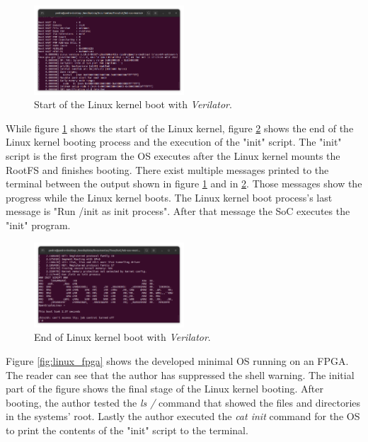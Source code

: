 \begin{figure}[!ht]
    \centering
    \includegraphics[width=0.5\textwidth]{../images/start_Linux_sim.png}
    \caption{Start of the Linux kernel boot with \textit{Verilator}.}
    \label{fig:start_linux_sim}
\end{figure}

While figure \ref{fig:start_linux_sim} shows the start of the Linux kernel, figure \ref{fig:end_linux_verilator} shows the end of the Linux kernel booting process and the execution of the "init" script. The "init" script is the first program the OS executes after the Linux kernel mounts the RootFS and finishes booting. There exist multiple messages printed to the terminal between the output shown in figure \ref{fig:start_linux_sim} and in \ref{fig:end_linux_verilator}. Those messages show the progress while the Linux kernel boots. The Linux kernel boot process's last message is "Run /init as init process". After that message the SoC executes the "init" program.

\begin{figure}[!ht]
    \centering
    \includegraphics[width=0.5\textwidth]{../images/end_Linux_sim.png}
    \caption{End of Linux kernel boot with \textit{Verilator}.}
    \label{fig:end_linux_verilator}
\end{figure}

Figure \ref{fig:linux_fpga} shows the developed minimal OS running on an FPGA. The reader can see that the author has suppressed the shell warning. The initial part of the figure shows the final stage of the Linux kernel booting. After booting, the author tested the \textit{ls /} command that showed the files and directories in the systems' root. Lastly the author executed the \textit{cat init} command for the OS to print the contents of the "init" script to the terminal.

